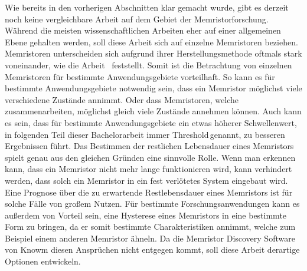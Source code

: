Wie bereits in den vorherigen Abschnitten klar gemacht wurde, gibt es derzeit noch keine vergleichbare Arbeit auf dem Gebiet der Memristorforschung. Während die meisten wissenschaftlichen Arbeiten eher auf einer allgemeinen Ebene gehalten werden, soll diese Arbeit sich auf einzelne Memristoren beziehen. Memristoren unterscheiden sich aufgrund ihrer Herstellungsmethode oftmals stark voneinander, wie die Arbeit~\cite{auto_adjust} feststellt. Somit ist die Betrachtung von einzelnen Memristoren für bestimmte Anwendungsgebiete vorteilhaft. So kann es für bestimmte Anwendungsgebiete notwendig sein, dass ein Memristor möglichst viele verschiedene Zustände annimmt. Oder dass Memristoren, welche zusammenarbeiten, möglichst gleich viele Zustände annehmen können. Auch kann es sein, dass für bestimmte Anwendungsgebiete ein etwas höherer Schwellenwert, in folgenden Teil dieser Bachelorarbeit immer \glqq Threshold\grqq\,genannt, zu besseren Ergebnissen führt. Das Bestimmen der restlichen Lebensdauer eines Memristors spielt genau aus den gleichen Gründen eine sinnvolle Rolle. Wenn man erkennen kann, dass ein Memristor nicht mehr lange funktionieren wird, kann verhindert werden, dass solch ein Memristor in ein fest verlötetes System eingebaut wird. Eine Prognose über die zu erwartende Restlebensdauer eines Memristors ist für solche Fälle von großem Nutzen. Für bestimmte Forschungsanwendungen kann es außerdem von Vorteil sein, eine Hysterese eines Memristors in eine bestimmte Form zu bringen, da er somit bestimmte Charakteristiken annimmt, welche zum Beispiel einem anderen Memristor ähneln. Da die Memristor Discovery Software von Knowm diesen Ansprüchen nicht entgegen kommt, soll diese Arbeit derartige Optionen entwickeln.
